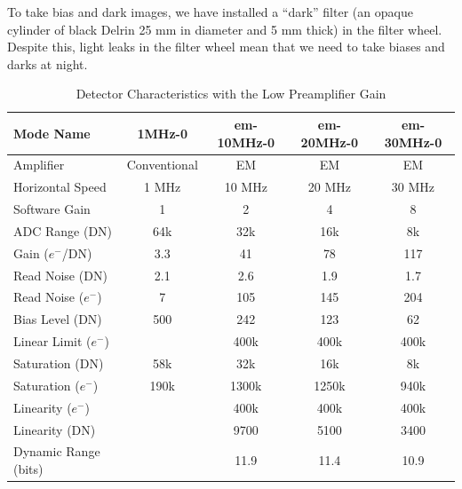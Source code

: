 To take bias and dark images, we have installed a “dark” filter (an opaque cylinder of black Delrin 25 mm in diameter and 5 mm thick) in the filter wheel. Despite this, light leaks in the filter wheel mean that we need to take biases and darks at night.

\begin{table}
    \centering
    \begin{tabular}{lcccc}
    \hline
    Mode Name&1MHz-0&em-10MHz-0&em-20MHz-0&em-30MHz-0\\
    \hline
    Amplifier&Conventional&EM&EM&EM\\
    Horizontal Speed&1 MHz&10 MHz&20 MHz&30 MHz\\
    Software Gain&1&2&4&8\\
    ADC Range (DN)&64k&32k&16k&8k\\
    Gain ($e^-$/DN)&3.3&41&78&117\\
    Read Noise (DN)&2.1&2.6&1.9&1.7\\
    Read Noise ($e^-$)&7&105&145&204\\
    Bias Level (DN)&500&242&123&62\\
    Linear Limit ($e^-$)&&400k&400k&400k\\
    Saturation (DN)&58k&32k&16k&8k\\
    Saturation ($e^-$)&190k&1300k&1250k&940k\\
    Linearity ($e^-$)&&400k&400k&400k\\
    Linearity (DN)&&9700&5100&3400\\
    Dynamic Range (bits)&&11.9&11.4&10.9\\
    \hline
    \end{tabular}
    \caption{Detector Characteristics with the Low Preamplifier Gain}
    \label{table:huitzi-f8-detector-characteristics-low-gain}
\end{table}

